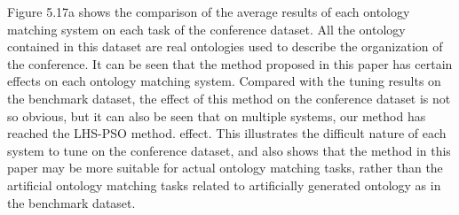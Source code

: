 \documentclass[twoside]{article}
\begin{document}
Figure 5.17a shows the comparison of the average results of each ontology matching system on each task of the conference dataset.
All the ontology contained in this dataset are real ontologies used to describe the organization of the conference.
It can be seen that the method proposed in this paper has certain effects on each ontology matching system.
Compared with the tuning results on the benchmark dataset, the effect of this method on the conference dataset is not so obvious, but it can also be seen that on multiple systems, our method has reached the LHS-PSO method. effect.
This illustrates the difficult nature of each system to tune on the conference dataset, and also shows that the method in this paper may be more suitable for actual ontology matching tasks, rather than the artificial ontology matching tasks related to artificially generated ontology as in the benchmark dataset.
\end{document}
